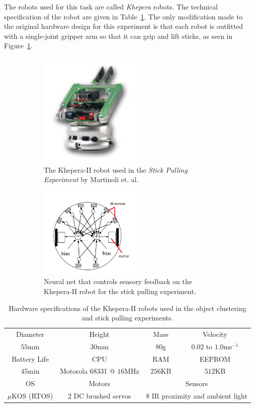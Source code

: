 \documentclass[Main.tex]{subfiles}
\begin{document}
The robots used for this task are called \emph{Khepera} robots. The technical specification of the robot are given in Table~\ref{tab:khepera}. The only modification made to the original hardware design for this experiment is that each robot is outfitted with a single-joint gripper arm so that it can grip and lift sticks, as seen in Figure~\ref{fig:khepbot}.

\begin{figure}[!htb]
\centering 
\begin{subfigure}[b]{6.5cm}
\includegraphics[width=5cm]{assets/khepera2robot.png}
\centering\caption{The Khepera-II robot used in the \emph{Stick Pulling Experiment} by Martinoli et. al.}\label{fig:khepbot}
\end{subfigure}
\qquad\centering
\begin{subfigure}[b]{6.5cm}
\includegraphics[width=5cm]{assets/kheperascem.png}
\centering\caption{Neural net that controls sensory feedback on the Khepera-II robot for the stick pulling experiment.}\label{fig:khepschem}
\end{subfigure}
\caption{}\label{fig:kheperastick}
\end{figure}

\begin{table}[htb]
\centering\begin{tabular}{|*{4}{c|}}
\hline
Diameter & Height & Mass & Velocity \\
$55$mm & $30$mm & $80$g & $0.02$ to $1.0$ms$^{-1}$ \\ \hline
Battery Life & CPU & RAM & EEPROM \\
45min & Motorola 68331 @ $16$MHz & $256$KB & $512$KB \\ \hline
OS & Motors & \multicolumn{2}{c|}{Sensors}\\
$\mu$KOS (RTOS) & 2 DC brushed servos & \multicolumn{2}{c|}{8 IR proximity and ambient light}\\
\hline
\end{tabular}
\caption{Hardware specifications of the Khepera-II robots used in the object clustering and stick pulling experiments.}\label{tab:khepera}
\end{table}
\end{document}

